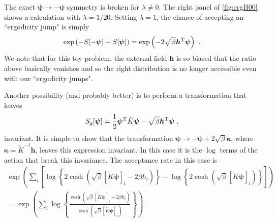 \documentclass[11pt]{article}
\begin{document}
The exact $\bm\psi\to -\bm \psi$ symmetry is broken for $\lambda\ne0$.  The right panel of \autoref{fig:ergH00} shows a calculation with $\lambda=1/20$.  Setting $\lambda=1$, the chance of accepting an ``ergodicity jump" is simply 
\begin{equation}
\exp\left(-S[-\bm\psi]+S[\bm \psi]\right)=\exp\left(-2\sqrt{\beta}\bm h^{\rm T}\bm\psi\right)\ .
\end{equation}
We note that for this toy problem, the external field $\bm h$ is so biased that the ratio above basically vanishes and so the right distribution is no longer accessible even with our ``ergodicity jumps".

Another possibility (and probably better) is to perform a transformation that leaves 
\begin{equation}
S_g[\bm\psi]=\frac{1}{2}\bm\psi^{\rm T} \tilde K\bm \psi-\sqrt{\beta}\bm h^{\rm T}\bm\psi\ ,
\end{equation}
invariant.  It is simple to show that the transformation $\bm \psi\to-\bm \psi+2\sqrt{\beta}\bm \kappa$, where $\bm \kappa=\tilde K^{-1}\bm h$, leaves this expression invariant.  In this case it is the $\log$ terms of the action that break this invariance. The acceptance rate in this case is
\begin{multline}
\exp\left(\sum_i\left[\log\left\{2\cosh\left(\sqrt{\beta}\left[\tilde K\bm\psi\right]_i-2\beta h_i\right)\right\}-\log\left\{2\cosh\left(\sqrt{\beta}\left[\tilde K\bm\psi\right]_i\right)\right\}\right]\right)\\
=\exp\left(\sum_i\log\left\{\frac{\cosh\left(\sqrt{\beta}\left[\tilde K\bm\psi\right]_i-2\beta h_i\right)}{\cosh\left(\sqrt{\beta}\left[\tilde K\bm\psi\right]_i\right)}\right\}\right)
\ .
\end{multline}


%
\end{document}
